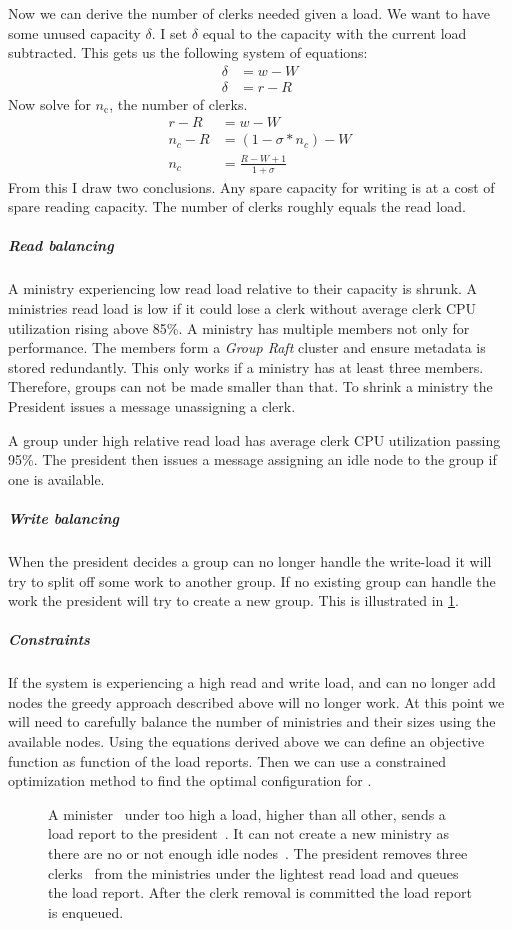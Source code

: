 Now we can derive the number of clerks needed given a load. We want to have some unused capacity $\delta$. I set $\delta$ equal to the capacity with the current load subtracted. This gets us the following system of equations: 
\begin{align}
	\delta &= w - W \\
	\delta &= r - R
\end{align}%
Now solve for $n_\text{c}$, the number of clerks.
\begin{align}
	r - R &= w - W \\
	n_c - R &= \left(1 - \sigma*n_c\right) - W \\
	n_c &= \frac{R - W + 1}{1 + \sigma} \label{eq:nc}
\end{align}
From this I draw two conclusions. Any spare capacity for writing is at a cost of spare reading capacity. The number of clerks roughly equals the read load.
%
%
\subparagraph*{Read balancing}
A ministry experiencing low read load relative to their capacity is shrunk. A ministries read load is low if it could lose a clerk without average clerk CPU utilization rising above 85\%. A ministry has multiple members not only for performance. The members form a \textit{Group Raft} cluster and ensure metadata is stored redundantly. This only works if a ministry has at least three members. Therefore, groups can not be made smaller than that. To shrink a ministry the President issues a \raft{} message unassigning a clerk. 

A group under high relative read load has average clerk CPU utilization passing 95\%. The president then issues a \raft{} message assigning an idle node to the group if one is available. %
%
\subparagraph*{Write balancing}
When the president decides a group can no longer handle the write-load it will try to split off some work to another group. If no existing group can handle the work the president will try to create a new group. This is illustrated in \cref{fig:subtree}.
%
\subparagraph*{Constraints}
If the system is experiencing a high read and write load, and can no longer add nodes the greedy approach described above will no longer work. At this point we will need to carefully balance the number of ministries and their sizes using the available nodes. Using the equations derived above we can define an objective function as function of the load reports. Then we can use a constrained optimization method to find the optimal configuration for \name{}.
%
\begin{figure}[htbp]
	\centering
	
	\caption{A minister~\amdsLeg{} under too high a load, higher than all other, sends a load report to the president~\presidentLeg{}. It can not create a new ministry as there are no or not enough idle nodes~\umdsLeg{}. The president removes three clerks~\cmdsLeg{} from the ministries under the lightest read load and queues the load report. After the clerk removal is committed the load report is enqueued. }
	\label{fig:subtree}
\end{figure}
